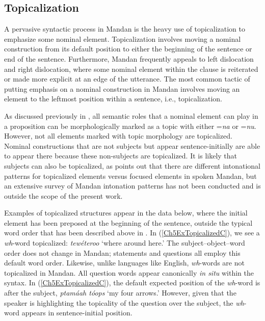 \subsection{Topicalization}\label{Ch5TopicAndFocus}
\largerpage
A pervasive syntactic process in Mandan is the heavy use of topicalization to emphasize some nominal element. Topicalization involves moving a nominal construction from its default position to either the beginning of the sentence or end of the sentence. Furthermore, Mandan frequently appeals to left dislocation and right dislocation, where some nominal element within the clause is reiterated or made more explicit at an edge of the utterance. The most common tactic of putting emphasis on a nominal construction in Mandan involves moving an element to the leftmost position within a sentence, i.e., topicalization.

As discussed previously in , all semantic roles that a nominal element can play in a proposition can be morphologically marked as a topic with either =\textit{na} or =\textit{nu}. However, not all elements marked with topic morphology are topicalized. Nominal constructions that are not subjects but appear sentence-initially are able to appear there because these non-subjects are topicalized. It is likely that subjects can also be topicalized, as \citet{kasak2022} points out that there are different intonational patterns for topicalized elements versus focused elements in spoken Mandan, but an extensive survey of Mandan intonation patterns has not been conducted and is outside the scope of the present work.

Examples of topicalized structures appear in the data below, where the initial element has been preposed at the beginning of the sentence, outside the typical word order that has been described above in . In (\ref{Ch5ExTopicalizedC}), we see a \textit{wh}-word topicalized: \textit{tewéteroo} `where around here.' The subject--object--word order does not change in Mandan; statements and questions all employ this default word order. Likewise, unlike languages like English, \textit{wh}-words are not topicalized in Mandan. All question words appear canonically \textit{in situ} within the syntax. In (\ref{Ch5ExTopicalizedC}), the default expected position of the \textit{wh}-word is after the subject, \textit{ptamáah tóops} `my four arrows.' However, given that the speaker is highlighting the topicality of the question over the subject, the \textit{wh}-word appears in sentence-initial position.

